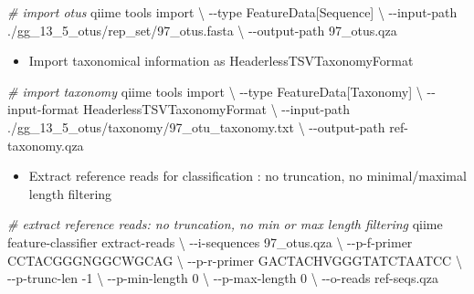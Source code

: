 \documentclass[
]{article}
\newenvironment{Shaded}{\begin{snugshade}}{\end{snugshade}}
\newcommand{\AttributeTok}[1]{\textcolor[rgb]{0.77,0.63,0.00}{#1}}
\newcommand{\CommentTok}[1]{\textcolor[rgb]{0.56,0.35,0.01}{\textit{#1}}}
\newcommand{\DataTypeTok}[1]{\textcolor[rgb]{0.13,0.29,0.53}{#1}}
\newcommand{\ExtensionTok}[1]{#1}
\newcommand{\NormalTok}[1]{#1}
\newcommand{\StringTok}[1]{\textcolor[rgb]{0.31,0.60,0.02}{#1}}
\providecommand{\tightlist}{%
  \setlength{\itemsep}{0pt}\setlength{\parskip}{0pt}}
\begin{document}
\begin{Shaded}
\begin{Highlighting}[]
\CommentTok{\# import otus}
\ExtensionTok{qiime}\NormalTok{ tools import }\DataTypeTok{\textbackslash{}}
  \AttributeTok{{-}{-}type} \StringTok{\textquotesingle{}FeatureData[Sequence]\textquotesingle{}} \DataTypeTok{\textbackslash{}}
  \AttributeTok{{-}{-}input{-}path}\NormalTok{ ./gg\_13\_5\_otus/rep\_set/97\_otus.fasta }\DataTypeTok{\textbackslash{}}
  \AttributeTok{{-}{-}output{-}path}\NormalTok{ 97\_otus.qza}
\end{Highlighting}
\end{Shaded}

\begin{itemize}
\tightlist
\item
  Import taxonomical information as HeaderlessTSVTaxonomyFormat
\end{itemize}

\begin{Shaded}
\begin{Highlighting}[]
\CommentTok{\# import taxonomy}
\ExtensionTok{qiime}\NormalTok{ tools import }\DataTypeTok{\textbackslash{}}
  \AttributeTok{{-}{-}type} \StringTok{\textquotesingle{}FeatureData[Taxonomy]\textquotesingle{}} \DataTypeTok{\textbackslash{}}
  \AttributeTok{{-}{-}input{-}format}\NormalTok{ HeaderlessTSVTaxonomyFormat }\DataTypeTok{\textbackslash{}}
  \AttributeTok{{-}{-}input{-}path}\NormalTok{ ./gg\_13\_5\_otus/taxonomy/97\_otu\_taxonomy.txt }\DataTypeTok{\textbackslash{}}
  \AttributeTok{{-}{-}output{-}path}\NormalTok{ ref{-}taxonomy.qza}
\end{Highlighting}
\end{Shaded}

\begin{itemize}
\tightlist
\item
  Extract reference reads for classification : no truncation, no
  minimal/maximal length filtering
\end{itemize}

\begin{Shaded}
\begin{Highlighting}[]
\CommentTok{\# extract reference reads: no truncation, no min or max length filtering}
\ExtensionTok{qiime}\NormalTok{ feature{-}classifier extract{-}reads }\DataTypeTok{\textbackslash{}}
  \AttributeTok{{-}{-}i{-}sequences}\NormalTok{ 97\_otus.qza }\DataTypeTok{\textbackslash{}}
  \AttributeTok{{-}{-}p{-}f{-}primer}\NormalTok{ CCTACGGGNGGCWGCAG }\DataTypeTok{\textbackslash{}}
  \AttributeTok{{-}{-}p{-}r{-}primer}\NormalTok{ GACTACHVGGGTATCTAATCC }\DataTypeTok{\textbackslash{}}
  \AttributeTok{{-}{-}p{-}trunc{-}len} \AttributeTok{{-}1} \DataTypeTok{\textbackslash{}}
  \AttributeTok{{-}{-}p{-}min{-}length}\NormalTok{ 0 }\DataTypeTok{\textbackslash{}}
  \AttributeTok{{-}{-}p{-}max{-}length}\NormalTok{ 0 }\DataTypeTok{\textbackslash{}}
  \AttributeTok{{-}{-}o{-}reads}\NormalTok{ ref{-}seqs.qza}
\end{Highlighting}
\end{Shaded}
\end{document}
